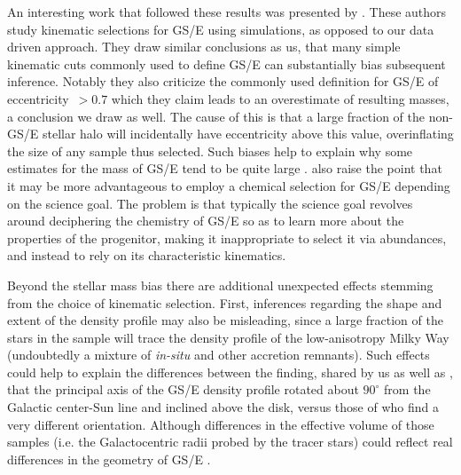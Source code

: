 An interesting work that followed these results was presented by \textcite{carrillo23}. These authors study kinematic selections for GS/E using simulations, as opposed to our data driven approach. They draw similar conclusions as us, that many simple kinematic cuts commonly used to define GS/E can substantially bias subsequent inference. Notably they also criticize the commonly used definition for GS/E of eccentricity~$> 0.7$ which they claim leads to an overestimate of resulting masses, a conclusion we draw as well. The cause of this is that a large fraction of the non-GS/E stellar halo will incidentally have eccentricity above this value, overinflating the size of any sample thus selected. Such biases help to explain why some estimates for the mass of GS/E tend to be quite large \parencite[e.g.][, who use this eccentricity cut to define GS/E]{han22}. \textcite{carrillo23} also raise the point that it may be more advantageous to employ a chemical selection for GS/E depending on the science goal. The problem is that typically the science goal revolves around deciphering the chemistry of GS/E so as to learn more about the properties of the progenitor, making it inappropriate to select it via abundances, and instead to rely on its characteristic kinematics.

Beyond the stellar mass bias there are additional unexpected effects stemming from the choice of kinematic selection. First, inferences regarding the shape and extent of the density profile may also be misleading, since a large fraction of the stars in the sample will trace the density profile of the low-anisotropy Milky Way (undoubtedly a mixture of \textit{in-situ} and other accretion remnants). Such effects could help to explain the differences between the finding, shared by us as well as \textcite{iorio21}, that the principal axis of the GS/E density profile rotated about $90^\circ$ from the Galactic center-Sun line and inclined above the disk, versus those of \textcite{han22} who find a very different orientation. Although differences in the effective volume of those samples (i.e. the Galactocentric radii probed by the tracer stars) could reflect real differences in the geometry of GS/E \parencite[see][ for an example of this in the outer halo]{chandra23}. 

